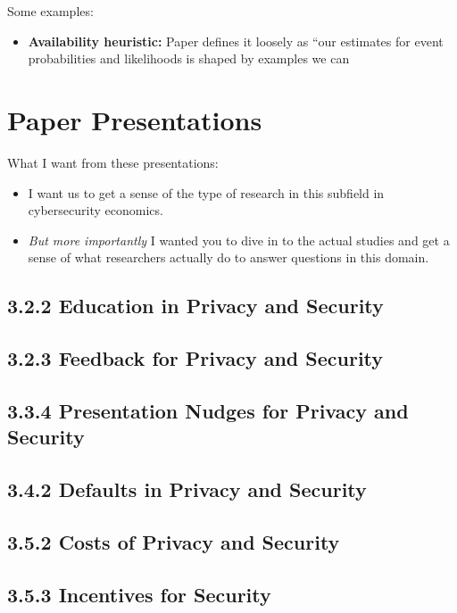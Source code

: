 \documentclass[11pt]{article}
\begin{document}
Some examples:
\begin{itemize}
    \item {\bf Availability heuristic:} Paper defines it loosely as ``our estimates for event probabilities and likelihoods is shaped by examples we can 
\end{itemize}




\section{Paper Presentations}

What I want from these presentations:
\begin{itemize}
    \item I want us to get a sense of the type of research in this subfield in cybersecurity economics.
    \item {\it But more importantly} I wanted you to dive in to the actual studies and get a sense of what researchers actually do to answer questions in this domain.
\end{itemize}

\subsection{3.2.2 Education in Privacy and Security}
\subsection{3.2.3 Feedback for Privacy and Security}
\subsection{3.3.4 Presentation Nudges for Privacy and Security}
\subsection{3.4.2 Defaults in Privacy and Security}
\subsection{3.5.2 Costs of Privacy and Security}
\subsection{3.5.3 Incentives for Security}
\end{document}
